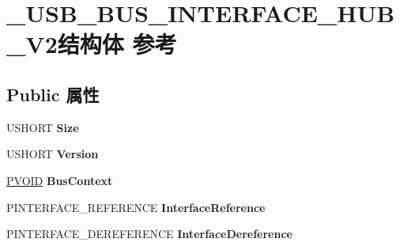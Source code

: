 \hypertarget{struct___u_s_b___b_u_s___i_n_t_e_r_f_a_c_e___h_u_b___v2}{}\section{\+\_\+\+U\+S\+B\+\_\+\+B\+U\+S\+\_\+\+I\+N\+T\+E\+R\+F\+A\+C\+E\+\_\+\+H\+U\+B\+\_\+\+V2结构体 参考}
\label{struct___u_s_b___b_u_s___i_n_t_e_r_f_a_c_e___h_u_b___v2}
\subsection*{Public 属性}
\begin{DoxyCompactItemize}
\item 
\mbox{\label{struct___u_s_b___b_u_s___i_n_t_e_r_f_a_c_e___h_u_b___v2_a8ee6ce2484c822e781114c79446448ae}} 
U\+S\+H\+O\+RT {\bfseries Size}
\item 
\mbox{\label{struct___u_s_b___b_u_s___i_n_t_e_r_f_a_c_e___h_u_b___v2_aaf03cd447f5eef311cafd6a88d53fdfc}} 
U\+S\+H\+O\+RT {\bfseries Version}
\item 
\mbox{\label{struct___u_s_b___b_u_s___i_n_t_e_r_f_a_c_e___h_u_b___v2_af5d004eda8a6eb427aed3b33b08b4484}} 
\hyperlink{interfacevoid}{P\+V\+O\+ID} {\bfseries Bus\+Context}
\item 
\mbox{\label{struct___u_s_b___b_u_s___i_n_t_e_r_f_a_c_e___h_u_b___v2_afd190fd666323981b00cefd86f3754ce}} 
P\+I\+N\+T\+E\+R\+F\+A\+C\+E\+\_\+\+R\+E\+F\+E\+R\+E\+N\+CE {\bfseries Interface\+Reference}
\item 
\mbox{\label{struct___u_s_b___b_u_s___i_n_t_e_r_f_a_c_e___h_u_b___v2_acce8ef6c7d01084ad71e12912469ca38}} 
P\+I\+N\+T\+E\+R\+F\+A\+C\+E\+\_\+\+D\+E\+R\+E\+F\+E\+R\+E\+N\+CE {\bfseries Interface\+Dereference}
\item 
\mbox{\label{struct___u_s_b___b_u_s___i_n_t_e_r_f_a_c_e___h_u_b___v2_a27220bc73fd54e1fe39da1271d0190fa}} 

\end{DoxyCompactItemize}
